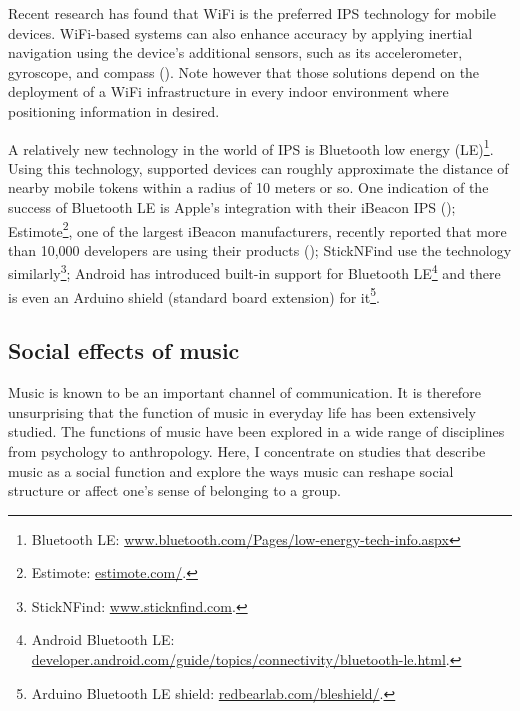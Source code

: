 \documentclass[a4paper,11pt]{article}
\begin{document}
Recent research has found that WiFi is the preferred IPS technology for mobile devices.
WiFi-based systems can also enhance accuracy by applying inertial navigation using the device's additional sensors, such as its accelerometer, gyroscope, and compass (\cite{web:harrop}).
Note however that those solutions depend on the deployment of a WiFi infrastructure in every indoor environment where positioning information in desired.

A relatively new technology in the world of IPS is Bluetooth low energy (LE)\footnote{Bluetooth LE: \href{http://www.bluetooth.com/Pages/low-energy-tech-info.aspx}{www.bluetooth.com/Pages/low-energy-tech-info.aspx}}.
Using this technology, supported devices can roughly approximate the distance of nearby mobile tokens within a radius of 10 meters or so.
One indication of the success of Bluetooth LE is Apple's integration with their iBeacon IPS (\cite{web:danova});
Estimote\footnote{Estimote: \href{http://estimote.com/}{estimote.com/}.}, one of the largest iBeacon manufacturers, recently reported that more than 10,000 developers are using their products (\cite{web:thompson});
StickNFind use the technology similarly\footnote{StickNFind: \href{https://www.sticknfind.com}{www.sticknfind.com}.};
Android has introduced built-in support for Bluetooth LE\footnote{Android Bluetooth LE: \href{http://developer.android.com/guide/topics/connectivity/bluetooth-le.html}{developer.android.com/guide/topics/connectivity/bluetooth-le.html}.} and there is even an Arduino shield (standard board extension) for it\footnote{Arduino Bluetooth LE shield: \href{http://redbearlab.com/bleshield/}{redbearlab.com/bleshield/}.}.

\subsection{Social effects of music} \label{literature:social_effects}

Music is known to be an important channel of communication.
It is therefore unsurprising that the function of music in everyday life has been extensively studied.
The functions of music have been explored in a wide range of disciplines from psychology to anthropology.
Here, I concentrate on studies that describe music as a social function and explore the ways music can reshape social structure or affect one's sense of belonging to a group.
\end{document}
